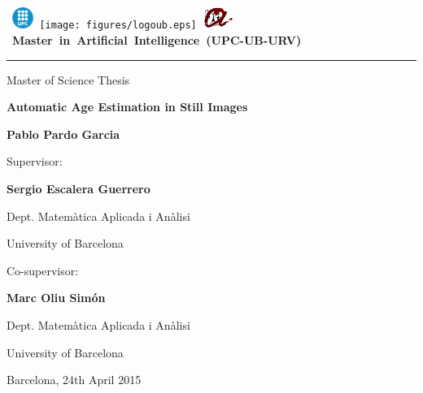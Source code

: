 \thispagestyle{empty}
\vspace*{-2cm}

\hbox{
\includegraphics[width=0.7cm]{figures/logoupc.eps}
\texttt{[image: figures/logoub.eps]}
\includegraphics[width=1cm]{figures/logourv.eps}
\Large \bf Master in Artificial Intelligence (UPC-UB-URV)}
\hrule

\bigskip\bigskip\bigskip

\begin{center}

{\LARGE Master of Science Thesis}

\bigskip\bigskip\bigskip\bigskip\bigskip

\textbf{\huge \bf Automatic Age Estimation in Still Images}

\bigskip\bigskip\bigskip\bigskip\bigskip

{\LARGE \bf Pablo Pardo Garcia}

\vspace*{5cm}

\begin{multicols}{2}
{\large Supervisor:}

\medskip\medskip\smallskip

{\Large\bf Sergio Escalera Guerrero}

\medskip\medskip

{\Large Dept. Matemàtica Aplicada i Anàlisi}

\medskip

{\Large University of Barcelona}


\bigskip\bigskip\bigskip

{\large Co-supervisor:}

\medskip\medskip\smallskip

{\Large\bf Marc Oliu Simón}

\medskip\medskip

{\Large Dept. Matemàtica Aplicada i Anàlisi}

\medskip

{\Large University of Barcelona}
\end{multicols}

\medskip\medskip\medskip\medskip\medskip

{\Large Barcelona, 24th April 2015}

\end{center}


